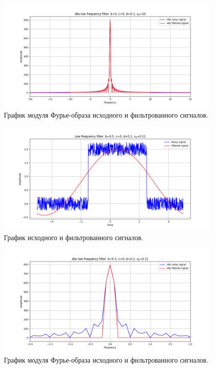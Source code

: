 \documentclass[a4paper, 12pt]{article}
\begin{document}
    \begin{figure}[!htb]
        \centering
        \includegraphics[scale=0.485]{4_abs_u_U_nohigh.png}
        \captionsetup{skip=0pt}
        \caption{График модуля Фурье-образа исходного и фильтрованного сигналов.}
        \label{fig:fig10}
    \end{figure}
    \begin{figure}[!htb]
        \centering
        \includegraphics[scale=0.485]{11_u_flt_u_nohigh.png}
        \captionsetup{skip=0pt}
        \caption{График исходного и фильтрованного сигналов.}
        \label{fig:fig11}
    \end{figure}
    \begin{figure}[!htb]
        \centering
        \includegraphics[scale=0.485]{11_abs_u_U_nohigh.png}
        \captionsetup{skip=0pt}
        \caption{График модуля Фурье-образа исходного и фильтрованного сигналов.}
        \label{fig:fig12}
    \end{figure}
\end{document}
